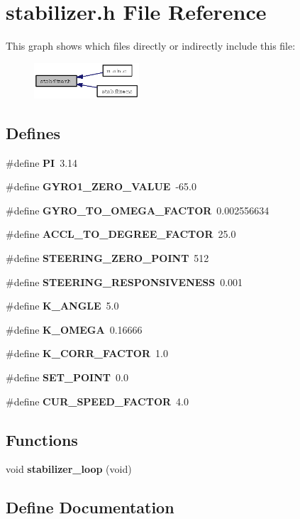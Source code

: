 \section{stabilizer.h File Reference}
\label{stabilizer_8h}


This graph shows which files directly or indirectly include this file:\begin{figure}[H]
\begin{center}
\leavevmode
\includegraphics[width=111pt]{stabilizer_8h__dep__incl}
\end{center}
\end{figure}
\subsection*{Defines}
\begin{CompactItemize}
\item 
\#define {\bf PI}~3.14
\item 
\#define {\bf GYRO1\_\-ZERO\_\-VALUE}~-65.0
\item 
\#define {\bf GYRO\_\-TO\_\-OMEGA\_\-FACTOR}~0.002556634
\item 
\#define {\bf ACCL\_\-TO\_\-DEGREE\_\-FACTOR}~25.0
\item 
\#define {\bf STEERING\_\-ZERO\_\-POINT}~512
\item 
\#define {\bf STEERING\_\-RESPONSIVENESS}~0.001
\item 
\#define {\bf K\_\-ANGLE}~5.0
\item 
\#define {\bf K\_\-OMEGA}~0.16666
\item 
\#define {\bf K\_\-CORR\_\-FACTOR}~1.0
\item 
\#define {\bf SET\_\-POINT}~0.0
\item 
\#define {\bf CUR\_\-SPEED\_\-FACTOR}~4.0
\end{CompactItemize}
\subsection*{Functions}
\begin{CompactItemize}
\item 
void {\bf stabilizer\_\-loop} (void)
\end{CompactItemize}


\subsection{Define Documentation}
